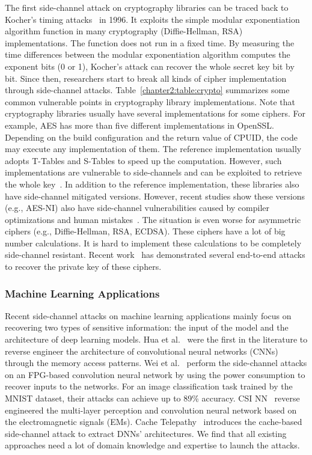 The first side-channel attack on cryptography libraries can be traced back to Kocher's timing attacks~\cite{kocher1996timing} in 1996. It exploits the simple modular exponentiation algorithm function in many cryptography (Diffie-Hellman, RSA) implementations. The function does not run in a fixed time. By measuring the time differences between the modular exponentiation algorithm computes the exponent bits (0 or 1), Kocher's attack can recover the whole secret key bit by bit. Since then, researchers start to break all kinds of cipher implementation through side-channel attacks.  Table~\ref{chapter2:table:crypto} summarizes some common vulnerable points in cryptography library implementations.  Note that cryptography libraries usually have several implementations for some ciphers.
For example, AES has more than five different implementations in OpenSSL. Depending on the build configuration and the return value of \textsf{CPUID}, the code may execute any implementation of them. The reference implementation usually adopts T-Tables and S-Tables to speed up the computation. However, such implementations are vulnerable to side-channels and can be exploited to retrieve the whole key~\cite{bonneau2006cache}. In addition to the reference implementation, these libraries also have side-channel mitigated versions. However, recent studies show these versions (e.g., AES-NI) also have side-channel vulnerabilities caused by compiler optimizations and human mistakes~\cite{217537}. The situation is even worse for asymmetric ciphers (e.g., Diffie-Hellman, RSA, ECDSA). These ciphers have a lot of big number calculations. It is hard to implement these calculations to be completely side-channel resistant. Recent work~\cite{arnaud2013timing,yarom2017cachebleed,yarom2014flush+} has demonstrated several end-to-end attacks to recover the private key of these ciphers. 

\subsubsection*{Machine Learning Applications}
Recent side-channel attacks on machine learning applications mainly focus on recovering two types of sensitive information: the input of the model and the architecture of deep learning models. Hua et al.~\cite{hua2018reverse} were the first in the literature to reverse engineer the architecture of convolutional neural networks (CNNs) through the memory access patterns. Wei et al.~\cite{wei2018know} perform the side-channel attacks on an FPG-based convolution neural network by using the power consumption to recover inputs to the networks. For an image classification task trained by the MNIST dataset, their attacks can achieve up to 89\% accuracy. CSI NN~\cite{batina2019csi} reverse engineered the multi-layer perception and convolution neural network based on the electromagnetic signals (EMs). Cache Telepathy~\cite{yan2020cache} introduces the cache-based side-channel attack to extract DNNs' architectures. We find that all existing approaches need a lot of domain knowledge and expertise to launch the attacks.

